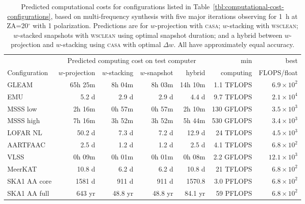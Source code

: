 \documentclass[useAMS,usenatbib]{mn2e}
\newcommand{\degree}{\ensuremath{^{\circ}}\xspace}
\begin{document}
\begin{table}
\caption{Predicted computational costs for configurations listed in Table~\ref{tbl:computational-cost-configurations}, based on multi-frequency synthesis with five major iterations observing for 1~h at ZA=20\degree with 1 polarization. Predictions are for $w$-projection with \textsc{casa}; $w$-stacking with \textsc{wsclean}; $w$-stacked snapshots with \textsc{wsclean} using optimal snapshot duration; and a hybrid between $w$-projection and $w$-stacking using \textsc{casa} with optimal $\Delta w$. All have approximately equal accuracy.} \label{tbl:computational-cost-predictions}
\begin{tabular}{l|rrrr|rr}
               & \multicolumn{4}{c|}{Predicted computing cost on test computer} & min & best \\
 Configuration & $w$-projection & $w$-stacking & $w$-snapshot & hybrid & computing & FLOPS/float \\
 \hline
 GLEAM    &  65h 25m & 8h 04m &  8h 03m & 14h 10m   & 1.1 TFLOPS & $6.9 \times 10^2$    \\
 EMU      &    5.2 d &  2.9 d &   2.9 d & 4.4 d     & 9.7 TFLOPS & $2.1 \times 10^4$      \\
 MSSS low &  2h 16m  & 0h 57m &  0h 57m & 2h 10m    & 130 GFLOPS & $3.5 \times 10^3$   \\
 MSSS high&  7h 16m  & 3h 52m &  3h 52m & 5h 44m    & 530 GFLOPS & $3.4 \times 10^3$   \\
 LOFAR NL &  50.2 d  &  7.3 d &   7.2 d & 12.9 d    &  24 TFLOPS & $4.5 \times 10^3$ \\
 AARTFAAC &  2.5 d   &  1.2 d &   1.2 d &   2.5 d   & 4.1 TFLOPS & $6.8 \times 10^2$   \\
 VLSS     &  0h 09m  & 0h 01m &  0h 01m &  0h 08m   & 2.2 GFLOPS & $12.1 \times 10^3$     \\
 MeerKAT  &   10.8 d &  6.2 d &   6.2 d &  10.8 d   &  21 TFLOPS & $6.8 \times 10^2$ \\
 SKA1 AA core&1581 d &  911 d &   911 d &  1570.8   & 3.0 PFLOPS & $6.8 \times 10^2$ \\
 SKA1 AA full& 643 yr& 48.8 yr & 48.8 yr& 84.1 yr   &  59 PFLOPS & $6.8 \times 10^2$ \\
\end{tabular}
\end{table}
\end{document}
